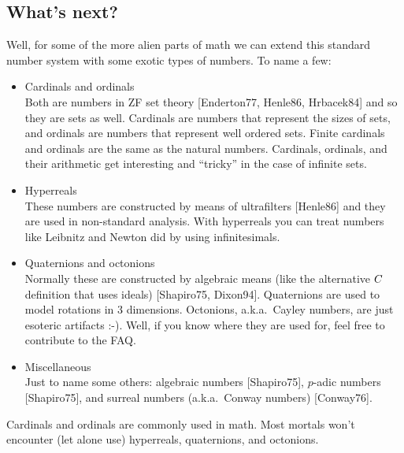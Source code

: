 \subsection{What's next?}

Well, for some of the more alien parts of math we can extend this
standard number system with some exotic types of numbers. To name a few:
\begin{itemize}
  \item Cardinals and ordinals \\
      Both are numbers in ZF set theory [Enderton77, Henle86, Hrbacek84] and
      so they are sets as well. Cardinals are numbers that represent the
      sizes of sets, and ordinals are numbers that represent well ordered
      sets. Finite cardinals and ordinals are the same as the natural
      numbers. Cardinals, ordinals, and their arithmetic get interesting and
      ``tricky'' in the case of infinite sets.
  \item Hyperreals \\
      These numbers are constructed by means of ultrafilters [Henle86] and
      they are used in non-standard analysis. With hyperreals you can treat
      numbers like Leibnitz and Newton did by using infinitesimals.
  \item Quaternions and octonions \\
      Normally these are constructed by algebraic means (like the alternative
      $C$ definition that uses ideals) [Shapiro75, Dixon94]. Quaternions are
      used to model rotations in 3 dimensions. Octonions, a.k.a.\ Cayley
      numbers, are just esoteric artifacts :-). Well, if you know where they
      are used for, feel free to contribute to the FAQ.
  \item Miscellaneous \\
      Just to name some others: algebraic numbers [Shapiro75], $p$-adic
      numbers [Shapiro75], and surreal numbers (a.k.a.\ Conway
      numbers) [Conway76].
\end{itemize}
Cardinals and ordinals are commonly used in math. Most mortals won't
encounter (let alone use) hyperreals, quaternions, and octonions.

